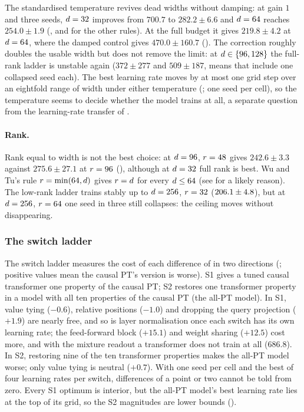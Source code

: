 The standardised temperature revives dead widths without damping: at gain $1$ and three seeds,
$d=32$ improves from $700.7$ to $282.2\pm6.6$ and $d=64$ reaches $254.0\pm1.9$
(, and  for the other rules). At the full budget
it gives $219.8\pm4.2$ at $d=64$, where the damped control gives $470.0\pm160.7$
(). The correction roughly doubles the usable width but does not remove the
limit: at $d\in\{96,128\}$ the full-rank ladder is unstable again ($372\pm277$ and
$509\pm187$, means that include one collapsed seed each). The best learning rate moves by at
most one grid step over an eightfold range of width under either temperature (;
one seed per cell),
so the temperature seems to decide whether the model trains at all, a separate question from the
learning-rate transfer of \citet{kuang2026scaling}.

\paragraph{Rank.}
Rank equal to width is not the best choice: at $d=96$, $r=48$ gives $242.6\pm3.3$
against $275.6\pm27.1$ at $r=96$ (), although at
$d=32$ full rank is best. Wu and Tu's rule $r=\min(64,d)$ gives $r=d$ for
every $d\le64$ (see  for a likely reason).
The low-rank ladder trains stably up to $d=256$, $r=32$
($206.1\pm4.8$), but at $d=256$, $r=64$ one seed in three still
collapses: the ceiling moves without disappearing.

\subsubsection{The switch ladder}
\label{sec:exp-switches}
The switch ladder measures the cost of each difference of  in two
directions (; positive values mean the causal PT's version is worse). S1
gives a tuned causal transformer one property of the causal PT; S2 restores one transformer
property in a model with all ten properties of the causal PT (the all-PT model). In S1, value
tying ($-0.6$), relative positions ($-1.0$) and dropping the query projection ($+1.9$) are nearly
free, and so is layer normalisation once each switch has its own learning rate; the
feed-forward block ($+15.1$) and weight sharing ($+12.5$) cost more, and with the mixture
readout a transformer does not train at all ($686.8$). In S2, restoring nine of the ten
transformer properties makes the all-PT model worse; only value tying is neutral ($+0.7$).
With one seed per cell and the best of four learning rates per switch, differences of a point or
two cannot be told from zero. Every S1 optimum is interior, but the all-PT model's best learning
rate lies at the top of its grid, so the S2 magnitudes are lower bounds ().

